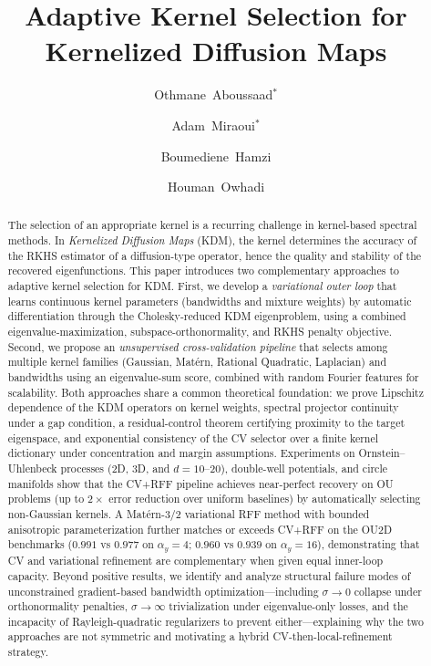\documentclass[11pt]{article}
\title{Adaptive Kernel Selection for Kernelized Diffusion Maps}
\author[1]{Othmane~Aboussaad$^{\ast}$}
\author[2]{Adam~Miraoui$^{\ast}$}
\author[3,4,5]{Boumediene~Hamzi}
\author[3]{Houman~Owhadi}
\affil[1]{CY Cergy Paris University}
\affil[2]{Institut Polytechnique de Paris}
\affil[3]{California Institute of Technology}
\affil[4]{The Alan Turing Institute}
\affil[5]{Imperial College London}
\date{}
\theoremstyle{remark}
\begin{document}
\maketitle
{}

\begin{abstract}
The selection of an appropriate kernel is a recurring challenge in kernel-based spectral methods.
In \emph{Kernelized Diffusion Maps} (KDM), the kernel determines the accuracy of the RKHS estimator of a diffusion-type operator, hence the quality and stability of the recovered eigenfunctions.
This paper introduces two complementary approaches to adaptive kernel selection for KDM.
First, we develop a \emph{variational outer loop} that learns continuous kernel parameters (bandwidths and mixture weights) by automatic differentiation through the Cholesky-reduced KDM eigenproblem, using a combined eigenvalue-maximization, subspace-orthonormality, and RKHS penalty objective.
Second, we propose an \emph{unsupervised cross-validation pipeline} that selects among multiple kernel families (Gaussian, Mat\'ern, Rational Quadratic, Laplacian) and bandwidths using an eigenvalue-sum score, combined with random Fourier features for scalability.
Both approaches share a common theoretical foundation: we prove Lipschitz dependence of the KDM operators on kernel weights, spectral projector continuity under a gap condition, a residual-control theorem certifying proximity to the target eigenspace, and exponential consistency of the CV selector over a finite kernel dictionary under concentration and margin assumptions.
Experiments on Ornstein--Uhlenbeck processes (2D, 3D, and $d=10$--$20$), double-well potentials, and circle manifolds show that the CV+RFF pipeline achieves near-perfect recovery on OU problems (up to $2\times$ error reduction over uniform baselines) by automatically selecting non-Gaussian kernels. A Mat\'ern-3/2 variational RFF method with bounded anisotropic parameterization further matches or exceeds CV+RFF on the OU2D benchmarks ($0.991$ vs $0.977$ on $\alpha_y=4$; $0.960$ vs $0.939$ on $\alpha_y=16$), demonstrating that CV and variational refinement are complementary when given equal inner-loop capacity.
Beyond positive results, we identify and analyze structural failure modes of unconstrained gradient-based bandwidth optimization---including $\sigma\to 0$ collapse under orthonormality penalties, $\sigma\to\infty$ trivialization under eigenvalue-only losses, and the incapacity of Rayleigh-quadratic regularizers to prevent either---explaining why the two approaches are not symmetric and motivating a hybrid CV-then-local-refinement strategy.
\end{abstract}
\end{document}
